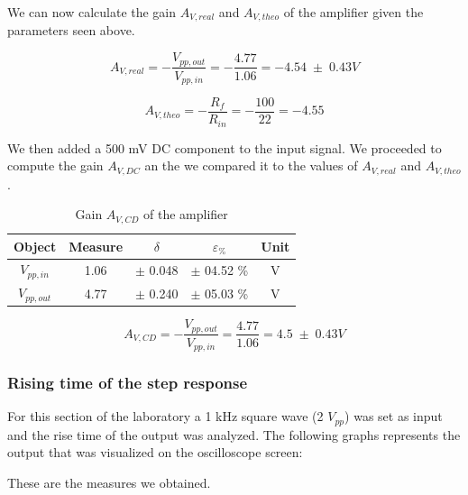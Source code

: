 \documentclass[../main.tex]{subfiles}
\begin{document}
We can now calculate the gain $A_{V,real}$ and $A_{V,theo}$ of the amplifier given the parameters seen above.

\begin{equation}
	A_{V,real} = -\frac{V_{pp,out}}{V_{pp,in}} = - \frac{4.77}{1.06} = - 4.54 \; \pm \;  0.43 \unit{V} 
\end{equation}

\begin{equation}
	A_{V,theo} = - \frac{R_f}{R_{in}} = - \frac{100}{22} = - 4.55
\end{equation}


We then added a 500 mV DC component to the input signal.
We proceeded to compute the gain $A_{V,DC}$ an the we compared it to the values of $A_{V,real}$ and $A_{V,theo}$.

 
\begin{table}[h!]
\centering	

\begin{tabular}{ccccc}
\textbf{Object} & \textbf{Measure}   & \textbf{$\delta$} & \textbf{$\varepsilon_{\%}$} & \textbf{Unit} \\
\hline
$V_{pp,in}$  & 1.06 & $\pm$ 0.048  & $\pm$ 04.52 \% &  V \\ 
\hline
$V_{pp,out}$ & 4.77 & $\pm$ 0.240  & $\pm$ 05.03 \% &  V \\ 

\end{tabular}
\caption*{Gain $A_{V,CD}$ of the amplifier}
\end{table}


\begin{equation}
	A_{V,CD} = -\frac{V_{pp,out}}{V_{pp,in}} = \frac{4.77}{1.06} = 4.5 \; \pm \; 0.43  \unit{V}  
\end{equation}



\subsubsection*{Rising time of the step response}


For this section of the laboratory a 1 kHz square wave (2 $V_{pp}$) was set as input and the rise time of the output was analyzed.
The following graphs represents the output that was visualized on the oscilloscope screen:


These are the measures we obtained.
\end{document}
